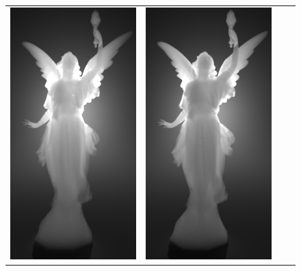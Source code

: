 \begin{figure}
\begin{tabular}{cccc}
        \includegraphics[width=\resLen]{images/lucy/color_400nm.jpg} &
        \includegraphics[width=\resLen]{images/lucy/color_550nm.jpg} &

\end{tabular}
\end{figure}

